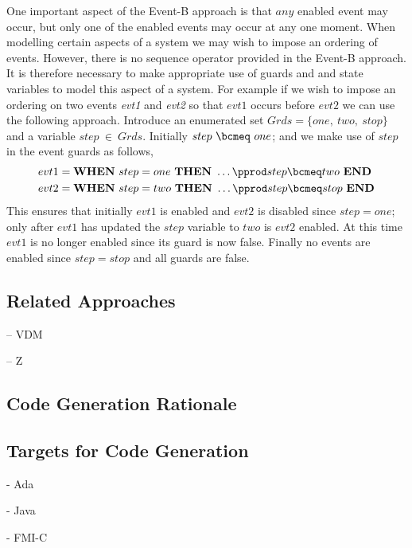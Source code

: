 One important aspect of the Event-B approach is that $any$ enabled event may occur, but only one of the enabled events may occur at any one moment. When modelling certain aspects of a system we may wish to impose an ordering of events. However, there is no sequence operator provided in the Event-B approach. It is therefore necessary to make appropriate use of guards and and state variables to model this aspect of a system. For example if we wish to impose an ordering on two events \emph{evt1} and \emph{evt2} so that $evt1$ occurs before $evt2$ we can use the following approach. Introduce an enumerated set $Grds = \{one,~ two,~ stop\}$ and a variable $step~\in~Grds$. Initially $step~\bcmeq~one$; and we make use of $step$ in the event guards as follows,
\begin{equation}
\begin{split}
&evt1 = \textbf{WHEN}~ step = one~ \textbf{THEN}~\ldots\pprod step \bcmeq two~ \textbf{END}\\
&evt2 = \textbf{WHEN}~ step = two~ \textbf{THEN}~\ldots\pprod step \bcmeq stop~ \textbf{END}\\
\end{split}
\notag
\end{equation}
This ensures that initially $evt1$ is enabled and $evt2$ is disabled since $step = one$; only after $evt1$ has updated the $step$ variable  to $two$ is $evt2$ enabled. At this time $evt1$ is no longer enabled since its guard is now false. Finally no events are enabled since $step = stop$ and all guards are false.


\subsection{Related Approaches}



-- VDM


-- Z
\subsection{Code Generation Rationale}


\subsection{Targets for Code Generation}

- Ada

- Java

- FMI-C
